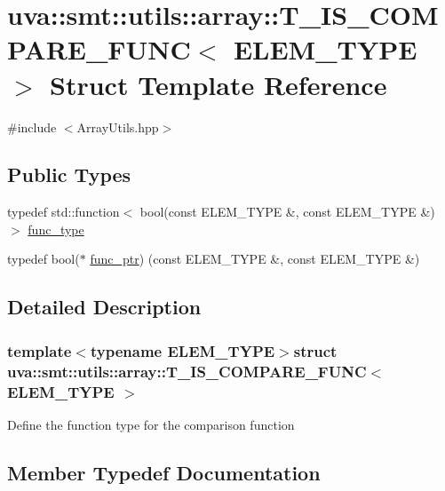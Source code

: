 \hypertarget{structuva_1_1smt_1_1utils_1_1array_1_1_t___i_s___c_o_m_p_a_r_e___f_u_n_c}{}\section{uva\+:\+:smt\+:\+:utils\+:\+:array\+:\+:T\+\_\+\+I\+S\+\_\+\+C\+O\+M\+P\+A\+R\+E\+\_\+\+F\+U\+N\+C$<$ E\+L\+E\+M\+\_\+\+T\+Y\+P\+E $>$ Struct Template Reference}
\label{structuva_1_1smt_1_1utils_1_1array_1_1_t___i_s___c_o_m_p_a_r_e___f_u_n_c}


{\ttfamily \#include $<$Array\+Utils.\+hpp$>$}

\subsection*{Public Types}
\begin{DoxyCompactItemize}
\item 
typedef std\+::function$<$ bool(const E\+L\+E\+M\+\_\+\+T\+Y\+P\+E \&, const E\+L\+E\+M\+\_\+\+T\+Y\+P\+E \&) $>$ \hyperlink{structuva_1_1smt_1_1utils_1_1array_1_1_t___i_s___c_o_m_p_a_r_e___f_u_n_c_a276e185a47597f5cc1c063627a49b9c0}{func\+\_\+type}
\item 
typedef bool($\ast$ \hyperlink{structuva_1_1smt_1_1utils_1_1array_1_1_t___i_s___c_o_m_p_a_r_e___f_u_n_c_a931202e466e2b3ed5f175cf22970a47a}{func\+\_\+ptr}) (const E\+L\+E\+M\+\_\+\+T\+Y\+P\+E \&, const E\+L\+E\+M\+\_\+\+T\+Y\+P\+E \&)
\end{DoxyCompactItemize}


\subsection{Detailed Description}
\subsubsection*{template$<$typename E\+L\+E\+M\+\_\+\+T\+Y\+P\+E$>$struct uva\+::smt\+::utils\+::array\+::\+T\+\_\+\+I\+S\+\_\+\+C\+O\+M\+P\+A\+R\+E\+\_\+\+F\+U\+N\+C$<$ E\+L\+E\+M\+\_\+\+T\+Y\+P\+E $>$}

Define the function type for the comparison function 

\subsection{Member Typedef Documentation}
\hypertarget{structuva_1_1smt_1_1utils_1_1array_1_1_t___i_s___c_o_m_p_a_r_e___f_u_n_c_a931202e466e2b3ed5f175cf22970a47a}{}
